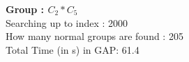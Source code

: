 \textbf{Group : $C_2*C_5$}\\
Searching up to index : 2000\\
How many normal groups are found : 205\\
Total Time (in s) in GAP: 61.4\\
